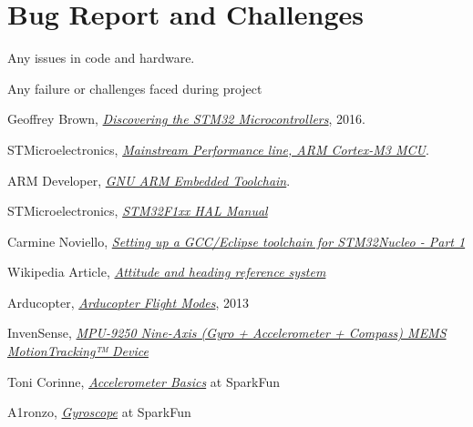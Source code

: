 \documentclass[a4paper,12pt,oneside]{book}
\begin{document}
\chapter[Bug Report and Challenges]{Bug Report and Challenges}
Any issues in code and hardware.

Any failure or challenges faced during project



\begin{thebibliography}{20}

Geoffrey Brown,
\href{https://www.cs.indiana.edu/~geobrown/book.pdf}{\textit{Discovering the STM32 Microcontrollers}}, 2016.

STMicroelectronics, \href{http://www.st.com/content/st_com/en/products/microcontrollers/stm32-32-bit-arm-cortex-mcus/stm32f1-series/stm32f103/stm32f103rb.html}{\textit{Mainstream Performance line, ARM Cortex-M3 MCU}}.

ARM Developer, \href{https://developer.arm.com/open-source/gnu-toolchain/gnu-rm}{\textit{GNU ARM Embedded Toolchain}}.

STMicroelectronics, \href{./datasheets/STM32F1 HAL Manual.pdf}{\textit{STM32F1xx HAL Manual}}

Carmine Noviello, \href{http://www.carminenoviello.com/2014/12/28/setting-gcceclipse-toolchain-stm32nucleo-part-1/}{\textit{Setting up a GCC/Eclipse toolchain for STM32Nucleo - Part 1}}

Wikipedia Article, \href{https://en.wikipedia.org/wiki/Attitude_and_heading_reference_system}{\textit{Attitude and heading reference system}}

Arducopter, \href{http://www.arducopter.co.uk/all-arducopter-guides/arducopter-flight-modes}{\textit{
Arducopter Flight Modes}}, 2013

InvenSense, \href{https://www.invensense.com/products/motion-tracking/9-axis/mpu-9250/}{\textit{MPU-9250 Nine-Axis (Gyro + Accelerometer + Compass) MEMS MotionTracking™ Device}}

Toni Corinne, \href{https://www.sparkfun.com/users/194976}{\textit{Accelerometer Basics}} at SparkFun

A1ronzo, \href{https://learn.sparkfun.com/tutorials/gyroscope/how-a-gyro-works}{\textit{Gyroscope}} at SparkFun


\end{thebibliography}
\end{document}
